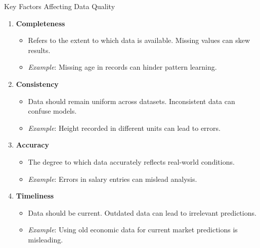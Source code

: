 \documentclass[aspectratio=169]{beamer}
\begin{document}
\begin{frame}{Key Factors Affecting Data Quality}
    \begin{enumerate}
        \item \textbf{Completeness}
            \begin{itemize}
                \item Refers to the extent to which data is available. Missing values can skew results.
                \item \textit{Example}: Missing age in records can hinder pattern learning.
            \end{itemize}
        \item \textbf{Consistency}
            \begin{itemize}
                \item Data should remain uniform across datasets. Inconsistent data can confuse models.
                \item \textit{Example}: Height recorded in different units can lead to errors.
            \end{itemize}
        \item \textbf{Accuracy}
            \begin{itemize}
                \item The degree to which data accurately reflects real-world conditions.
                \item \textit{Example}: Errors in salary entries can mislead analysis.
            \end{itemize}
        \item \textbf{Timeliness}
            \begin{itemize}
                \item Data should be current. Outdated data can lead to irrelevant predictions.
                \item \textit{Example}: Using old economic data for current market predictions is misleading.
            \end{itemize}
    \end{enumerate}
\end{frame}
\end{document}
